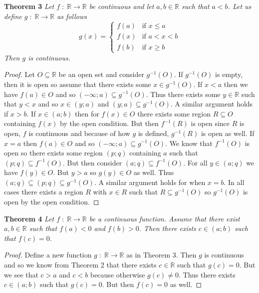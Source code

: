\documentclass{article}
\begin{document}
\begin{flushleft}
\textbf{Theorem 3}
\textsl{Let $f \; : \; \mathbb{R} \rightarrow \mathbb{R}$ be continuous and let $a,b \in \mathbb{R}$ such that $a<b$. Let us define $g \; : \; \mathbb{R} \rightarrow \mathbb{R}$ as follows
\[
g(x)=
\begin{cases}
f(a) & \text{if $x \leq a$}\\
f(x) & \text{if $a<x<b$}\\
f(b) & \text{if $x \geq b$}
\end{cases}
\]
Then $g$ is continuous.}
\begin{proof}
Let $O \subseteq \mathbb{R}$ be an open set and consider $g^{-1}(O)$. If $g^{-1}(O)$ is empty, then it is open so assume that there exists some $x \in g^{-1}(O)$. If $x < a$ then we have $f(a) \in O$ and so $(- \infty ; a) \subseteq g^{-1}(O)$. Thus there exists some $y \in \mathbb{R}$ such that $y<x$ and so $x \in (y;a)$ and $(y;a) \subseteq g^{-1}(O)$. A similar argument holds if $x > b$. If $x \in (a;b)$ then for $f(x) \in O$ there exists some region $R \subseteq O$ containing $f(x)$ by the open condition. But then $f^{-1}(R)$ is open since $R$ is open, $f$ is continuous and because of how $g$ is defined, $g^{-1}(R)$ is open as well. If $x=a$ then $f(a) \in O$ and so $(-\infty ; a) \subseteq g^{-1}(O)$. We know that $f^{-1}(O)$ is open so there exists some region $(p;q)$ containing $a$ such that $(p;q) \subseteq f^{-1}(O)$. But then consider $(a;q) \subseteq f^{-1}(O)$. For all $y \in (a;q)$ we have $f(y) \in O$. But $y>a$ so $g(y) \in O$ as well. Thus $(a;q) \subseteq (p;q) \subseteq g^{-1}(O)$. A similar argument holds for when $x=b$. In all cases there exists a region $R$ with $x \in R$ such that $R \subseteq g^{-1}(O)$ so $g^{-1}(O)$ is open by the open condition.
\end{proof}

\textbf{Theorem 4}
\textsl{Let $f \; : \; \mathbb{R} \rightarrow \mathbb{R}$ be a continuous function. Assume that there exist $a,b \in \mathbb{R}$ such that $f(a)<0$ and $f(b)>0$. Then there exists $c \in (a;b)$ such that $f(c)=0$.}
\begin{proof}
Define a new function $g \; : \; \mathbb{R} \rightarrow \mathbb{R}$ as in Theorem 3. Then $g$ is continuous and so we know from Theorem 2 that there exists $c \in \mathbb{R}$ such that $g(c) = 0$. But we see that $c>a$ and $c<b$ because otherwise $g(c) \neq 0$. Thus there exists $c \in (a;b)$ such that $g(c)=0$. But then $f(c)=0$ as well.
\end{proof}


\end{flushleft}
\end{document}
